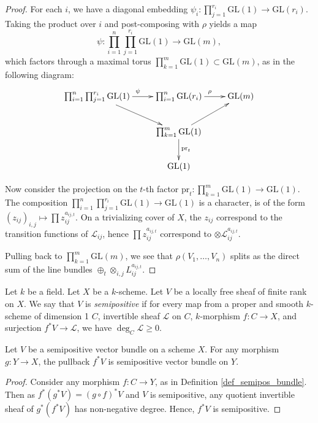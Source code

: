 \begin{proof}
For each $i$, we have a diagonal embedding $\psi_i:\prod_{j=1}^{r_i}\mathrm{GL}(1)\to \mathrm{GL}(r_i)$.
Taking the product over $i$ and post-composing with $\rho$ yields a map
$$
\psi:\prod_{i=1}^{n}\prod_{j=1}^{r_i}\mathrm{GL}(1)\to \mathrm{GL}(m),
$$
which factors through a maximal torus $\prod_{k=1}^{m}\mathrm{GL}(1)\subset \mathrm{GL}(m)$, as in the following diagram:
$$
\xymatrix{
\prod_{i=1}^{n}\prod_{j=1}^{r_i} \mathrm{GL}(1)\ar[r]^{\psi} \ar[rd] &\prod_{i=1}^{n}\mathrm{GL}(r_i)\ar[r]^{\rho} &\mathrm{GL}(m)\\
&\prod_{k=1}^{m}\mathrm{GL}(1)\ar[ru]\ar[d]^{\mathrm{pr}_t}&\\
&\mathrm{GL}(1)&
}
$$


Now consider the projection on the $t$-th factor $\mathrm{pr}_t:\prod_{k=1}^m\mathrm{GL}(1)\to \mathrm{GL}(1)$. The composition $\prod_{i=1}^n\prod_{j=1}^{r_i} \mathrm{GL}(1)\to \mathrm{GL}(1)$ is a character, is of the form $(z_{ij})_{i,j}\mapsto \prod z_{ij}^{a_{ij,t}}$. On a trivializing cover of $X$, the $z_{ij}$ correspond to the transition functions of $\mathcal{L}_{ij}$, hence $\prod z_{ij}^{a_{ij,t}}$ correspond to $\otimes\mathcal{L}_{ij}^{a_{ij,t}}$.

Pulling back to $\prod_{k=1}^{m} \mathrm{GL}(m)$, we see that $\rho(V_1,\ldots,V_n)$ splits as the direct sum of the line bundles $\oplus_t \otimes_{i,j}L_{ij}^{a_{ij,t}}$.

\end{proof}



\begin{definition}\label{def_semipos_bundle}
Let $k$ be a field.
Let $X$ be a $k$-scheme.
Let $V$ be a locally free sheaf of finite rank on $X$.
We say that $V$ is \textit{semipositive} if for every map from a proper and smooth $k$-scheme of dimension 1 $C$, invertible sheaf $\mathcal{L}$ on $C$, $k$-morphism $f:C\to X$, and surjection $f^{*}V\to\mathcal{L}$, we have $\deg_C\mathcal{L}\ge0$.\end{definition}

\begin{lemma}\label{pullback of semipos}
Let $V$ be a semipositive vector bundle on a scheme $X$. For any morphism $g:Y\to X$, the pullback $f^*V$ is semipositive vector bundle on $Y$.
\end{lemma}
\begin{proof}
Consider any morphism $f:C\to Y$, as in Definition \ref{def_semipos_bundle}. Then as $f^*(g^*V)=(g\circ f)^*V$ and $V$ is semipositive, any quotient invertible sheaf of $g^*(f^*V)$ has non-negative degree. Hence, $f^*V$ is semipositive.
\end{proof}

